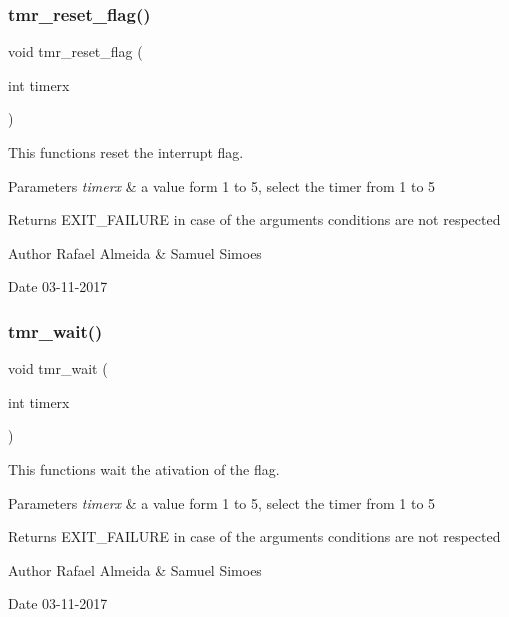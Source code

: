 \subsubsection{tmr\+\_\+reset\+\_\+flag()}
{\footnotesize\ttfamily void tmr\+\_\+reset\+\_\+flag (\begin{DoxyParamCaption}\item[{int}]{timerx }\end{DoxyParamCaption})}



This functions reset the interrupt flag. 


\begin{DoxyParams}{Parameters}
{\em timerx} & a value form 1 to 5, select the timer from 1 to 5 \\
\hline
\end{DoxyParams}
\begin{DoxyReturn}{Returns}
E\+X\+I\+T\+\_\+\+F\+A\+I\+L\+U\+RE in case of the argument\textquotesingle{}s conditions are not respected 
\end{DoxyReturn}
\begin{DoxyAuthor}{Author}
Rafael Almeida \& Samuel Simoes 
\end{DoxyAuthor}
\begin{DoxyDate}{Date}
03-\/11-\/2017 
\end{DoxyDate}
\mbox{\label{timer__libs_8h_a303cd7354e05d6a9cb43021b28a37fc5}} 
\subsubsection{tmr\+\_\+wait()}
{\footnotesize\ttfamily void tmr\+\_\+wait (\begin{DoxyParamCaption}\item[{int}]{timerx }\end{DoxyParamCaption})}



This functions wait the ativation of the flag. 


\begin{DoxyParams}{Parameters}
{\em timerx} & a value form 1 to 5, select the timer from 1 to 5\\
\hline
\end{DoxyParams}
\begin{DoxyReturn}{Returns}
E\+X\+I\+T\+\_\+\+F\+A\+I\+L\+U\+RE in case of the argument\textquotesingle{}s conditions are not respected 
\end{DoxyReturn}
\begin{DoxyAuthor}{Author}
Rafael Almeida \& Samuel Simoes 
\end{DoxyAuthor}
\begin{DoxyDate}{Date}
03-\/11-\/2017 
\end{DoxyDate}
